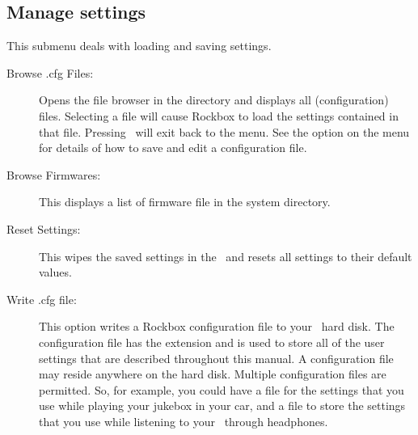 \subsection{\label{ref:manage_settings}Manage settings}
This submenu deals with loading and saving settings. 
%
  \begin{description}
    \item [Browse .cfg Files: ]Opens the file browser in the 
     directory and displays all  (configuration) files.
    Selecting a  file will cause Rockbox to load the settings
    contained in that file. Pressing \ButtonLeft\ will exit back to the menu. 
    See the  option on the  menu for
    details of how to save and edit a configuration file.
    \item [Browse Firmwares: ]This displays a list of firmware file in
    the  system directory. %
    \item [Reset Settings: ]This wipes the saved settings in the \dap\ and
    resets all settings to their default values.
    \item [Write .cfg file: ]This option writes a Rockbox configuration file
    to your \daps\ hard disk. The configuration file has the 
    extension and is used to store all of the user settings that are described
    throughout this manual.
    A configuration file may reside anywhere on the hard disk. Multiple
    configuration files are permitted. So, for example, you could have
    a  file for the settings that you use while playing your
    jukebox in your car, and a  file to store the
    settings that you use while listening to your \dap\ through headphones.


\end{description}
